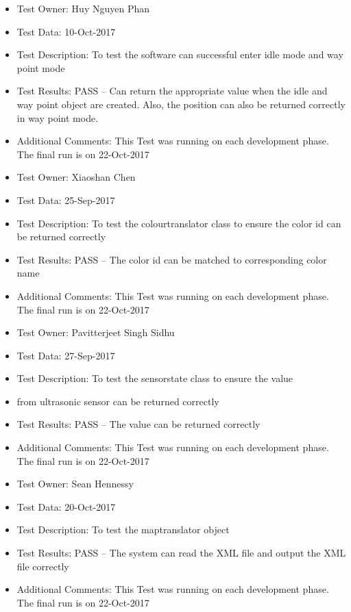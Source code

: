 \documentclass[10pt,a4paper,titlepage]{article}
\begin{document}
\begin{itemize}
\item Test Owner: Huy Nguyen Phan
\item Test Data: 10-Oct-2017
\item Test Description: To test the software can successful enter idle mode and way point mode
\item Test Results: PASS – Can return the appropriate value when the idle and way point object are created. Also, the position can also be returned correctly in way point mode.
\item Additional Comments: This Test was running on each development phase. The final run is on 22-Oct-2017
\end{itemize}

\begin{itemize}
\item Test Owner: Xiaoshan Chen
\item Test Data: 25-Sep-2017
\item Test Description: To test the colourtranslator class to ensure the color id can be returned correctly
\item Test Results: PASS – The color id can be matched to corresponding color name
\item Additional Comments: This Test was running on each development phase. The final run is on 22-Oct-2017
\end{itemize}


\begin{itemize}
\item Test Owner: Pavitterjeet Singh Sidhu
\item Test Data: 27-Sep-2017
\item Test Description: To test the sensorstate class to ensure the value \item from ultrasonic sensor can be returned correctly
\item Test Results: PASS – The value can be returned correctly
\item Additional Comments: This Test was running on each development phase. The final run is on 22-Oct-2017

\end{itemize}

\begin{itemize}
\item Test Owner: Sean Hennessy
\item Test Data: 20-Oct-2017
\item Test Description: To test the maptranslator object
\item Test Results: PASS – The system can read the XML file and output the XML file correctly  
\item Additional Comments: This Test was running on each development phase. The final run is on 22-Oct-2017

\end{itemize}
\end{document}
